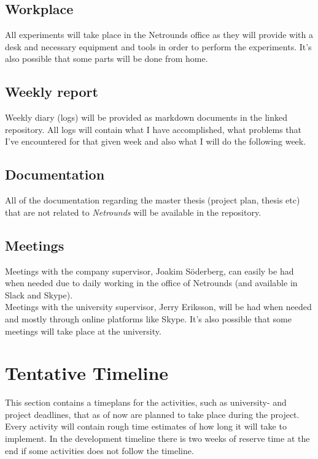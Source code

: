 \documentclass[10pt, titlepage, oneside, a4paper]{article}
\def\netrounds_supervisor{Joakim Söderberg}
\def\uni_supervisor{Jerry Eriksson}
\begin{document}
\subsection{Workplace}
All experiments will take place in the Netrounds office as they will provide with a desk and necessary equipment and tools in order to perform the experiments. It's also possible that some parts will be done from home.

\subsection{Weekly report}

Weekly diary (logs) will be provided as markdown documents in the linked repository. All logs will contain what I have accomplished, what problems that I've encountered for that given week and also what I will do the following week.

\subsection{Documentation}

All of the documentation regarding the master thesis (project plan, thesis etc) that are not related to \textit{Netrounds} will be available in the repository. 

\subsection{Meetings}

Meetings with the company supervisor, \netrounds_supervisor, can easily be had when needed due to daily working in the office of Netrounds (and available in Slack and Skype).\\ 

Meetings with the university supervisor, \uni_supervisor, will be had when needed and mostly through online platforms like Skype. It's also possible that some meetings will take place at the university.



\section{Tentative Timeline}

This section contains a timeplans for the activities, such as university- and project deadlines, that as of now are planned to take place during the project. Every activity will contain rough time estimates of how long it will take to implement. In the development timeline there is two weeks of reserve time at the end if some activities does not follow the timeline.
\end{document}
